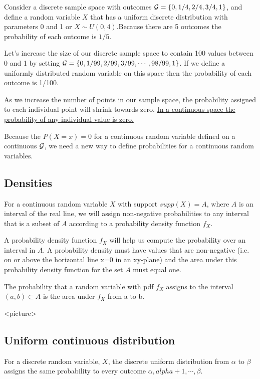 Consider a discrete sample space with outcomes $\mathcal{G} = \{0, 1/4, 2/4, 3/4, 1 \}$, and define a random variable $X$ that has a uniform discrete distribution with parameters 0 and 1 or $X \sim U(0,4)$.Because there are 5 outcomes the probability of each outcome is $1/5$.  

Let's increase the size of our discrete sample space to contain 100 values between 0 and 1 by setting $\mathcal{G} = \{0, 1/99, 2/99, 3/99, \cdots, 98/99, 1 \}$. If we define a uniformly distributed random variable on this space then the probability of each outcome is 1/100. 

As we increase the number of points in our sample space, the probability assigned to each individual point will shrink towards zero. \underline{In a continuous space the probability of any individual value is zero.}

Because the $P(X=x) = 0$ for a continuous random variable defined on a continuous $\mathcal{G}$, we need a new way to define probabilities for a continuous random variables.

\subsection{Densities}

For a continuous random variable $X$ with support $supp(X) = A$, where $A$ is an interval of the real line, we will assign non-negative probabilities to any interval that is a subset of $A$ according to a probability density function $f_{X}$. 

A probability density function $f_{X}$ will help us compute the probability over an interval in $A$. A probability density must have values that are non-negative (i.e. on or above the horizontal line x=0 in an xy-plane) and the area under this probability density function for the set $A$ must equal one.

The probability that a random variable with pdf $f_{X}$ assigns to the interval $(a,b) \subset A$ is the area under $f_{X}$ from a to b.

<picture>


\subsection{Uniform continuous distribution}

For a discrete random variable, $X$, the discrete uniform distribution from $\alpha$ to $\beta$ assigns the same probability to every outcome $\alpha,alpha+1,\cdots,\beta$.

